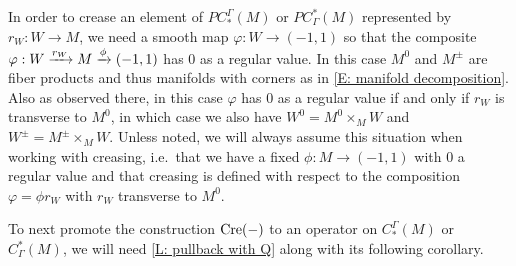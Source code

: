\begin{convention}\label{C: regular value setup}
In order to crease an element of $PC_*^\Gamma(M)$ or $PC^*_\Gamma(M)$ represented by $r_W \colon W \to M$, we need a smooth map $\varphi \colon W \to (-1,1)$ so that the composite $\varphi: W \xrightarrow{r_W}M \xrightarrow{\phi} (-1,1)$ has $0$ as a regular value. In this case $M^0$ and $M^\pm$ are fiber products and thus manifolds with corners as in \cref{E: manifold decomposition}. Also as observed there, in this case $\varphi$ has $0$ as a regular value if and only if $r_W$ is transverse to $M^0$, in which case we also have $W^0 = M^0 \times_M W$ and $W^\pm = M^\pm \times_M W$. Unless noted, we will always assume this situation when working with creasing, i.e.\ that we have a fixed $\phi \colon M \to (-1,1)$ with $0$ a regular value and that creasing is defined with respect to the composition $\varphi = \phi r_W$ with $r_W$ transverse to $M^0$.
\end{convention}


To next promote the construction $\mathrm{Cre}(-)$ to an operator on $C_*^{\Gamma}(M)$ or $C^*_\Gamma(M)$, we will need \cref{L: pullback with Q} along with its following corollary.


